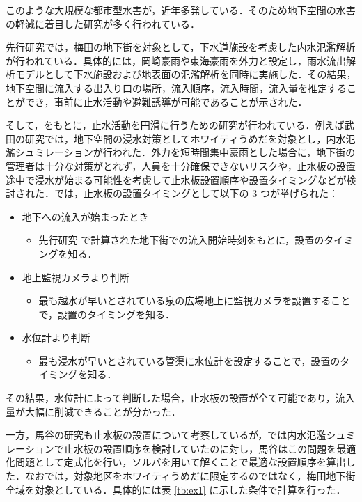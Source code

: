 \documentclass[a4paper,12pt,fleqn]{jarticle}
\begin{document}
このような大規模な都市型水害が，近年多発している．そのため地下空間の水害の軽減に着目した研究が多く行われている．

先行研究\cite{水工学論文集1,水工学論文集2}では，梅田の地下街を対象として，下水道施設を考慮した内水氾濫解析が行われている．具体的には，岡崎豪雨や東海豪雨を外力と設定し，雨水流出解析モデルとして下水施設および地表面の氾濫解析を同時に実施した．その結果，地下空間に流入する出入り口の場所，流入順序，流入時間，流入量を推定することができ，事前に止水活動や避難誘導が可能であることが示された．%

そして，\cite{水工学論文集1,水工学論文集2}をもとに，止水活動を円滑に行うための研究が行われている．例えば武田の研究\cite{武田さん卒論}では，地下空間の浸水対策としてホワイティうめだを対象とし，内水氾濫シュミレーションが行われた．外力を短時間集中豪雨とした場合に，地下街の管理者は十分な対策がとれず，人員を十分確保できないリスクや，止水板の設置途中で浸水が始まる可能性を考慮して止水板設置順序や設置タイミングなどが検討された．\cite{武田さん卒論}では，止水板の設置タイミングとして以下の $3$ つが挙げられた：

\newpage
\begin{itemize}
\item 地下への流入が始まったとき
   \begin{itemize}
   \item 先行研究 \cite{水工学論文集3}で計算された地下街での流入開始時刻をもとに，設置のタイミングを知る．
   \end{itemize}
\item 地上監視カメラより判断
   \begin{itemize}
   \item 最も越水が早いとされている泉の広場地上に監視カメラを設置することで，設置のタイミングを知る．
   \end{itemize}
\item 水位計より判断
   \begin{itemize}
   \item 最も浸水が早いとされている管渠に水位計を設定することで，設置のタイミングを知る．
   \end{itemize}
\end{itemize}
その結果，水位計によって判断した場合，止水板の設置が全て可能であり，流入量が大幅に削減できることが分かった．

\bigskip

一方，馬谷の研究\cite{馬谷さん卒論}も止水板の設置について考察しているが，\cite{武田さん卒論}では内水氾濫シュミレーションで止水板の設置順序を検討していたのに対し，馬谷はこの問題を最適化問題として定式化を行い，ソルバを用いて解くことで最適な設置順序を算出した．なお\cite{馬谷さん卒論}では，対象地区をホワイティうめだに限定するのではなく，梅田地下街全域を対象としている．具体的には表 \ref{tb:ex1} に示した条件で計算を行った．
\end{document}
